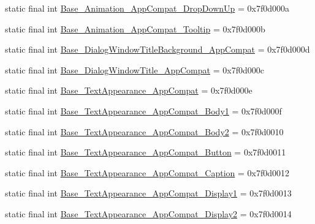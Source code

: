 \begin{DoxyCompactItemize}
\item 
static final int \mbox{\hyperlink{classandroid_1_1support_1_1design_1_1_r_1_1style_a5f411ec5e655a9763c28ecfd298e9e8a}{Base\+\_\+\+Animation\+\_\+\+App\+Compat\+\_\+\+Drop\+Down\+Up}} = 0x7f0d000a
\item 
static final int \mbox{\hyperlink{classandroid_1_1support_1_1design_1_1_r_1_1style_ae52fcb70895e0c0330cf522a0dc0649c}{Base\+\_\+\+Animation\+\_\+\+App\+Compat\+\_\+\+Tooltip}} = 0x7f0d000b
\item 
static final int \mbox{\hyperlink{classandroid_1_1support_1_1design_1_1_r_1_1style_a206a09a3d56b243175ac0425e4861ce9}{Base\+\_\+\+Dialog\+Window\+Title\+Background\+\_\+\+App\+Compat}} = 0x7f0d000d
\item 
static final int \mbox{\hyperlink{classandroid_1_1support_1_1design_1_1_r_1_1style_a476f4387fec10156084906d154b6eba6}{Base\+\_\+\+Dialog\+Window\+Title\+\_\+\+App\+Compat}} = 0x7f0d000c
\item 
static final int \mbox{\hyperlink{classandroid_1_1support_1_1design_1_1_r_1_1style_ab59a4ce42c1b2e787d54c04c8482593d}{Base\+\_\+\+Text\+Appearance\+\_\+\+App\+Compat}} = 0x7f0d000e
\item 
static final int \mbox{\hyperlink{classandroid_1_1support_1_1design_1_1_r_1_1style_a1c720a456a5085382ac584cac0b0bab4}{Base\+\_\+\+Text\+Appearance\+\_\+\+App\+Compat\+\_\+\+Body1}} = 0x7f0d000f
\item 
static final int \mbox{\hyperlink{classandroid_1_1support_1_1design_1_1_r_1_1style_a5d5e30cfe76ac49b6714e25e393b07a5}{Base\+\_\+\+Text\+Appearance\+\_\+\+App\+Compat\+\_\+\+Body2}} = 0x7f0d0010
\item 
static final int \mbox{\hyperlink{classandroid_1_1support_1_1design_1_1_r_1_1style_a49e39263b4eb37684aba06a6e360201d}{Base\+\_\+\+Text\+Appearance\+\_\+\+App\+Compat\+\_\+\+Button}} = 0x7f0d0011
\item 
static final int \mbox{\hyperlink{classandroid_1_1support_1_1design_1_1_r_1_1style_ab01622f4fbc20917df4953bbe0d1c1a7}{Base\+\_\+\+Text\+Appearance\+\_\+\+App\+Compat\+\_\+\+Caption}} = 0x7f0d0012
\item 
static final int \mbox{\hyperlink{classandroid_1_1support_1_1design_1_1_r_1_1style_ac11ffe6c88514201d4a71fee6bf6fa1e}{Base\+\_\+\+Text\+Appearance\+\_\+\+App\+Compat\+\_\+\+Display1}} = 0x7f0d0013
\item 
static final int \mbox{\hyperlink{classandroid_1_1support_1_1design_1_1_r_1_1style_a6d3af5c10efbdd0fc2b08e2526b2cbb5}{Base\+\_\+\+Text\+Appearance\+\_\+\+App\+Compat\+\_\+\+Display2}} = 0x7f0d0014

\end{DoxyCompactItemize}
